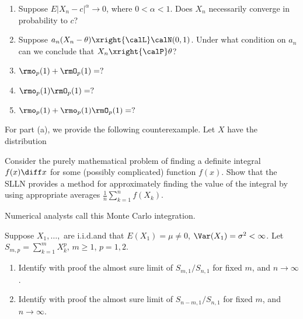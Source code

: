 \begin{problem}[DasGupta 7.2 (a), (b), (c), (d), (e)]
  \begin{enumerate}[label=(\alph*),noitemsep]
  \item Suppose \(E|X_n-c|^\alpha\to 0\), where \(0<\alpha<1\). Does
    \(X_n\) necessarily converge in probability to \(c\)?
  \item Suppose \(a_n(X_n-\theta)\xright{\calL}\calN(0,1)\). Under what
    condition on \(a_n\) can we conclude that \(X_n\xright{\calP}\theta\)?
  \item \(\rmo_p(1)+\rmO_p(1)=?\)
  \item \(\rmo_p(1)\rmO_p(1)=?\)
  \item \(\rmo_p(1)+\rmo_p(1)\rmO_p(1)=?\)
  \end{enumerate}
\end{problem}
\begin{solution}
  For part (a), we provide the following counterexample. Let \(X\) have the
  distribution
\end{solution}
\newpage

\begin{problem}
  Consider the purely mathematical problem of finding a definite integral
  \(f(x)\diff x\) for some (possibly complicated) function \(f(x)\). Show
  that the SLLN provides a method for approximately finding the value of
  the integral by using appropriate averages
  \(\frac{1}{n}\sum_{k=1}^n f(X_k)\).

  Numerical analysts call this Monte Carlo integration.
\end{problem}
\begin{solution}

\end{solution}
\newpage

\begin{problem}[DasGupta 7.4 (a), (b)]
  Suppose \(X_1,\dotsc,\) are i.i.d.\@ and that \(E(X_1)=\mu\neq 0\),
  \(\Var(X_1)=\sigma^2<\infty\). Let \(S_{m,p}=\sum_{k=1}^m X_k^p\),
  \(m\geq 1\), \(p=1,2\).
  \begin{enumerate}[label=(\alph*),noitemsep]
  \item Identify with proof the almost sure limit of \(S_{m,1}/S_{n,1}\)
    for fixed \(m\), and \(n\to\infty\).
  \item Identify with proof the almost sure limit of \(S_{n-m,1}/S_{n,1}\)
    for fixed \(m\), and \(n\to\infty\).
  \end{enumerate}
\end{problem}
\begin{solution}

\end{solution}
\newpage

